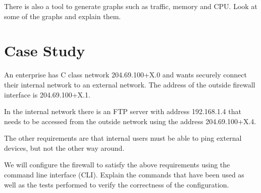 There is also a tool to generate graphs such as traffic, memory and CPU.
Look at some of the graphs and explain them.

\section{Case Study}

An enterprise has C class network 204.69.100+X.0 and wants securely connect their internal network to an external network.
The address of the outside firewall interface is 204.69.100+X.1.

In the internal network there is an FTP server with address 192.168.1.4 that needs to be accessed from the outside network using the address 204.69.100+X.4.

The other requirements are that internal users must be able to ping external devices, but not the other way around.

We will configure the firewall to satisfy the above requirements using the command line interface (CLI).
Explain the commands that have been used as well as the tests performed to verify the correctness of the configuration.
